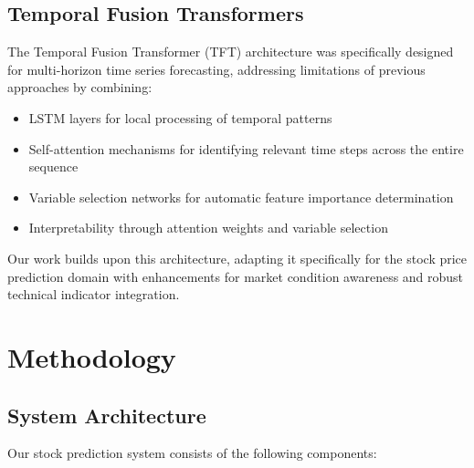\documentclass[conference]{IEEEtran}
\begin{document}
\subsection{Temporal Fusion Transformers}

The Temporal Fusion Transformer (TFT) architecture \cite{lim2021temporal} was specifically designed for multi-horizon time series forecasting, addressing limitations of previous approaches by combining:

\begin{itemize}
\item LSTM layers for local processing of temporal patterns
\item Self-attention mechanisms for identifying relevant time steps across the entire sequence
\item Variable selection networks for automatic feature importance determination
\item Interpretability through attention weights and variable selection
\end{itemize}

Our work builds upon this architecture, adapting it specifically for the stock price prediction domain with enhancements for market condition awareness and robust technical indicator integration.

\section{Methodology}

\subsection{System Architecture}

Our stock prediction system consists of the following components:
\end{document}

